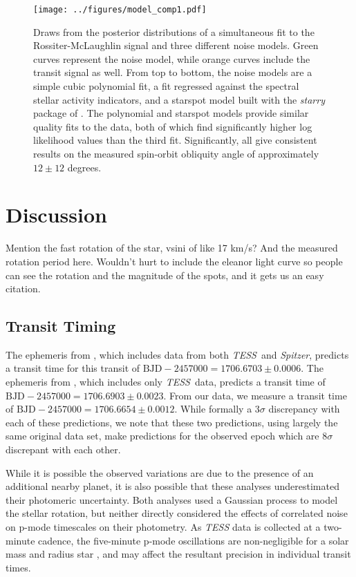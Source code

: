 \documentclass[twocolumn]{aastex63}
\newcommand{\tess}{{\it TESS}}
\newcommand{\spitz}{{\it Spitzer}}
\begin{document}
\begin{figure}[!tbh]
  \begin{center}
    \texttt{[image: ../figures/model\_comp1.pdf]}
   \end{center}
  \caption{Draws from the posterior distributions of a simultaneous fit to the
  Rossiter-McLaughlin signal and three different noise models. Green curves represent the noise model, while orange curves include the transit signal as well. From top to bottom, the noise models are a simple cubic polynomial fit, a fit regressed against the spectral stellar activity indicators, and a starspot model built with the \textit{starry} package of \citep{Luger19}. The polynomial and starspot models provide similar quality fits to the data, both of which find significantly higher log likelihood values than the third fit. Significantly, all give consistent results on the measured spin-orbit obliquity angle of approximately $12 \pm 12$ degrees.}
  \label{fig:models}
\end{figure}

\section{Discussion}
\label{sec:discussion}



Mention the fast rotation of the star, vsini of like 17 km/s? And the measured rotation period here. Wouldn't hurt to include the eleanor light curve so people can see the rotation and the magnitude of the spots, and it gets us an easy citation.

\subsection{Transit Timing}

The ephemeris from \citet{Newton19}, which includes data from both \tess\ and \spitz, predicts a transit time for this transit of $\textrm{BJD}- 2457000 = 1706.6703 \pm 0.0006$. 
The ephemeris from \citet{Benatti19}, which includes only \tess\ data, predicts a transit time of  $\textrm{BJD}- 2457000 = 1706.6903 \pm 0.0023$. 
From our data, we measure a transit time of $\textrm{BJD}- 2457000 = 1706.6654 \pm  0.0012$. 
While formally a $3\sigma$ discrepancy with each of these predictions, we note that these two predictions, using largely the same original data set, make predictions for the observed epoch which are $8\sigma$ discrepant with each other. 

While it is possible the observed variations are due to the presence of an additional nearby planet, it is also possible that these analyses underestimated their photomeric uncertainty. 
Both analyses used a Gaussian process to model the stellar rotation, but neither directly considered the effects of correlated noise on p-mode timescales on their photometry. 
As \textit{TESS} data is collected at a two-minute cadence, the five-minute p-mode oscillations are non-negligible for a solar mass and radius star \citep{Chaplin13}, and may affect the resultant precision in individual transit times.
\end{document}
